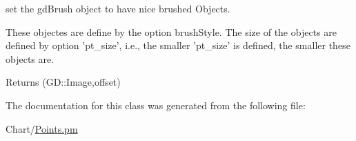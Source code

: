 set the gdBrush object to have nice brushed Objects. 

These objectes are define by the option brushStyle. The size of the objects are defined by option 'pt\_\-size', i.e., the smaller 'pt\_\-size' is defined, the smaller these objects are.

\begin{DoxyReturn}{Returns}
(GD::Image,offset) 
\end{DoxyReturn}


The documentation for this class was generated from the following file:\begin{DoxyCompactItemize}
\item 
Chart/\hyperlink{Points_8pm}{Points.pm}\end{DoxyCompactItemize}
